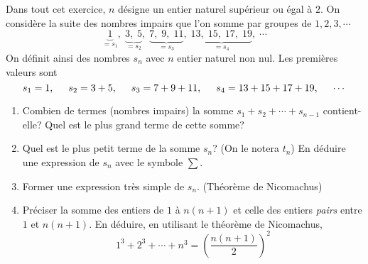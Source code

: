 Dans tout cet exercice, $n$ désigne un entier naturel supérieur ou égal à $2$.\newline
On considère la suite des nombres impairs que l'on somme par groupes de $1, 2, 3, \cdots$
\begin{displaymath}
 \underset{=s_1}{\underbrace{1}},\; \underset{=s_2}{\underbrace{3 ,\; 5}},\; \underset{=s_3}{\underbrace{7 ,\; 9 ,\; 11}},\;
 \underset{=s_4}{\underbrace{13 ,\; 15 ,\; 17 ,\; 19}},\;\cdots
\end{displaymath}
On définit ainsi des nombres $s_n$ avec $n$ entier naturel non nul. Les premières valeurs sont
\begin{displaymath}
 s_1=1, \hspace{0.5cm}s_2 = 3 + 5, \hspace{0.5cm} s_3 = 7 + 9 + 11, \hspace{0.5cm} s_4 = 13 + 15 + 17 + 19, \hspace{0.5cm} \cdots
\end{displaymath}
\begin{enumerate}
 \item Combien de termes (nombres impairs) la somme $s_1 + s_2 + \cdots + s_{n-1}$ contient-elle? Quel est le plus grand terme de cette somme?
 
 \item Quel est le plus petit terme de la somme $s_n$? (On le notera $t_n$) En déduire une expression de $s_n$ avec le symbole $\sum$.
 
 \item Former une expression très simple de $s_n$. (Théorème de Nicomachus)
 
 \item Préciser la somme des entiers de $1$ à $n(n+1)$ et celle des entiers \emph{pairs} entre $1$ et $n(n+1)$. En déduire, en utilisant le théorème de Nicomachus,
\begin{displaymath}
 1^3 + 2^3 + \cdots + n^3 = \left( \frac{n(n+1)}{2}\right)^2  
\end{displaymath}

\end{enumerate}
